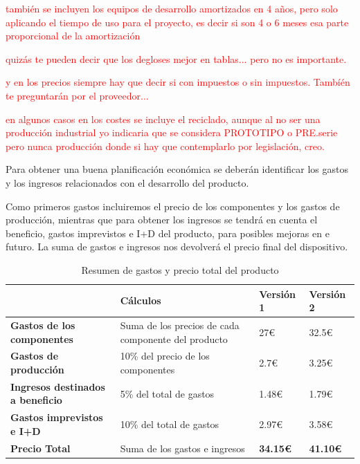 \textcolor{red}{también se incluyen los equipos  de desarrollo amortizados en 4 años, pero solo aplicando el tiempo de uso para el proyecto, es decir si son 4 o 6 meses esa parte proporcional de la amortización}

\textcolor{red}{quizás te pueden decir que los degloses mejor en tablas... pero no es importante.}

\textcolor{red}{y en los precios siempre hay que decir si con impuestos o sin impuestos. Tambíén te preguntarán por el proveedor...}

\textcolor{red}{en algunos casos en los costes se incluye el reciclado, aunque al no ser una producción industrial yo indicaria que se considera PROTOTIPO o PRE.serie pero nunca producción donde si hay que contemplarlo por legislación, creo.}

Para obtener una buena planificación económica se deberán identificar los gastos y los ingresos relacionados con el desarrollo del producto.

Como primeros gastos incluiremos el precio de los componentes y los gastos de producción, mientras que para obtener los ingresos se tendrá en cuenta el beneficio, gastos imprevistos e I+D del producto, para posibles mejoras en e futuro. La suma de gastos e ingresos nos devolverá el precio final del dispositivo.


\begin{table}[h!]
\centering
\begin{tabular}{ |m{4cm}|m{4cm}|m{2cm}|m{2cm}|  } 
\hline
\cellcolor[HTML]{B9E3F0}\textbf{} & \cellcolor[HTML]{B9E3F0}\textbf{Cálculos} & \cellcolor[HTML]{B9E3F0}\textbf{Versión 1}& \cellcolor[HTML]{B9E3F0}\textbf{Versión 2}\\

\hline
\cellcolor[HTML]{EFEFEF}\textbf{Gastos de los componentes}             & {Suma de los precios de cada componente del producto}   & 27€ & 32.5€\\
\hline
\cellcolor[HTML]{EFEFEF}\textbf{Gastos de producción}                & {10\% del precio de los componentes} & 2.7€ & 3.25€\\
\hline
\cellcolor[HTML]{EFEFEF}\textbf{Ingresos destinados a beneficio}                & {5\% del total de gastos} & 1.48€ & 1.79€\\
\hline
\cellcolor[HTML]{EFEFEF}\textbf{Gastos imprevistos e I+D} & {10\% del total de gastos} & 2.97€ & 3.58€\\
\hline
\cellcolor[HTML]{EFEFEF}\textbf{Precio Total} & {Suma de los gastos e ingresos} & \textbf{34.15€} & \textbf{41.10€}\\
\hline
\end{tabular}
\caption{Resumen de gastos y precio total del producto}
\end{table}

